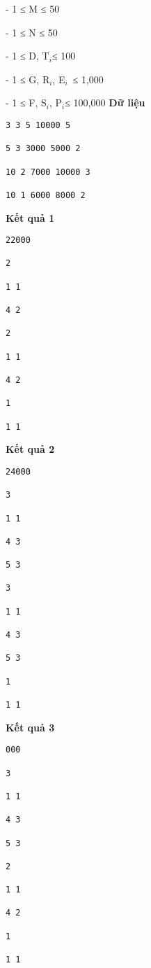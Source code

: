 - 1 ≤ M ≤ 50

- 1 ≤ N ≤ 50

- 1 ≤ D, T$_i $≤ 100

- 1 ≤ G, R$_i$, E$_i$ ≤ 1,000

- 1 ≤ F, S$_i$, P$_i $≤ 100,000
\textbf{Dữ liệu}
\begin{verbatim}
3 3 5 10000 5

5 3 3000 5000 2

10 2 7000 10000 3

10 1 6000 8000 2

\end{verbatim}

\textbf{Kết quả 1}
\begin{verbatim}
22000

2

1 1

4 2

2

1 1

4 2

1

1 1

\end{verbatim}

\textbf{Kết quả 2}
\begin{verbatim}
24000

3

1 1

4 3

5 3

3

1 1

4 3

5 3

1

1 1

\end{verbatim}

\textbf{Kết quả 3}
\begin{verbatim}
000

3

1 1

4 3

5 3

2

1 1

4 2

1

1 1\end{verbatim}

